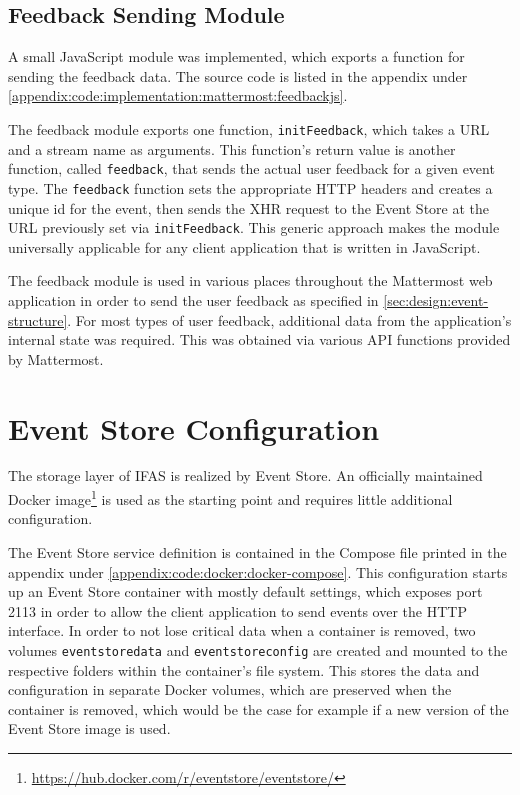 \subsection{Feedback Sending Module}

A small JavaScript module was implemented, which exports a function for sending the feedback data.
The source code is listed in the appendix under \cref{appendix:code:implementation:mattermost:feedbackjs}.

The feedback module exports one function, \texttt{initFeedback}, which takes a URL and a stream name as arguments.
This function's return value is another function, called \texttt{feedback}, that sends the actual user feedback for a given event type.
The \texttt{feedback} function sets the appropriate \ac{HTTP} headers and creates a unique id for the event, then sends the \ac{XHR} request to the Event Store at the URL previously set via \texttt{initFeedback}.
This generic approach makes the module universally applicable for any client application that is written in JavaScript.

The feedback module is used in various places throughout the Mattermost web application in order to send the user feedback as specified in \cref{sec:design:event-structure}.
For most types of user feedback, additional data from the application's internal state was required.
This was obtained via various \ac{API} functions provided by Mattermost.

\section{Event Store Configuration}
\label{sec:implementation:storage}

The storage layer of \ac{IFAS} is realized by Event Store.
An officially maintained Docker image\footnote{\url{https://hub.docker.com/r/eventstore/eventstore/}} is used as the starting point and requires little additional configuration.

The Event Store service definition is contained in the Compose file printed in the appendix under \cref{appendix:code:docker:docker-compose}.
This configuration starts up an Event Store container with mostly default settings, which exposes port 2113 in order to allow the client application to send events over the \ac{HTTP} interface.
In order to not lose critical data when a container is removed, two volumes \texttt{eventstoredata} and \texttt{eventstoreconfig} are created and mounted to the respective folders within the container's file system.
This stores the data and configuration in separate Docker volumes, which are preserved when the container is removed, which would be the case for example if a new version of the Event Store image is used.


